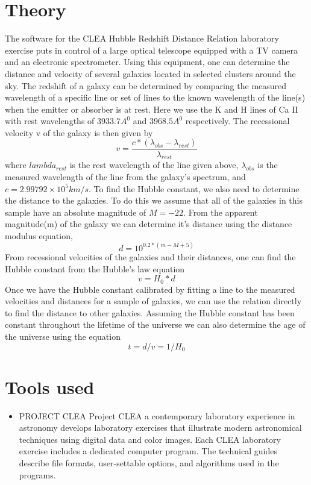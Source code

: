 \documentclass[letterpaper,11pt]{report}
\begin{document}
\section{Theory}
The software for the CLEA Hubble Redshift Distance Relation laboratory exercise puts in control of a large optical telescope equipped with a TV camera and an electronic spectrometer. Using this equipment, one can determine the distance and velocity of several galaxies located in selected clusters around the sky. The redshift of a galaxy can be determined by comparing the measured wavelength of a specific line or set of lines to the known wavelength of the line(s) when the emitter or absorber is at rest. Here we use the K and H lines of Ca II with rest wavelengths of $3933.7A^0$ and $3968.5A^0$ respectively. The recessional velocity v of the galaxy is then given by
\begin{equation}
    v=\frac{c*(\lambda_{obs}-\lambda_{rest})}{\lambda_{rest}}
\end{equation}
where $lambda_{rest}$ is the rest wavelength of the line given above, $\lambda_{obs}$ is the measured wavelength of the line from the galaxy’s spectrum, and $c=2.99792 × 10^5 km/s$.
\newline
To find the Hubble constant, we also need to determine the distance to the galaxies. To do this we assume that all of the galaxies in this sample have an absolute magnitude of $M=-22$. From the apparent magnitude(m) of the galaxy we can determine it's distance using the distance modulus equation,
\begin{equation}
    d=10^{0.2*(m-M+5)}
\end{equation}
From recessional velocities of the galaxies and their distances, one can find the Hubble constant from the Hubble’s law equation
\begin{equation}
    v= H_0*d
\end{equation}
Once we have the Hubble constant calibrated by fitting a line to the measured velocities and distances for a sample of galaxies, we can use the relation directly to find the distance to other galaxies.  Assuming the Hubble constant has been constant throughout the lifetime of the universe we can also determine the age of the universe using the equation
\begin{equation}
    t=d/v=1/H_0
\end{equation}
\newline

\section{Tools used}
\begin{itemize}
    \item PROJECT CLEA
    \newline
    Project CLEA a contemporary laboratory experience in astronomy develops laboratory exercises that illustrate modern astronomical techniques using digital data and color images. Each CLEA laboratory exercise includes a dedicated computer program. The technical guides describe file formats, user-settable options, and algorithms used in the programs.
\end{itemize}
\end{document}
